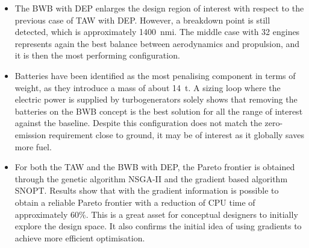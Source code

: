 \begin{itemize}
	\item The BWB with DEP enlarges the design region of interest with respect to the previous case of TAW with DEP.
	However, a breakdown point is still detected, which is approximately 1400~nmi. 
	The middle case with 32 engines represents again the best balance between aerodynamics and propulsion, and it is then the most performing configuration.
	
	\item Batteries have been identified as the most penalising component in terms of weight, as they introduce a mass of about 14~\si{\tonne}. 
	A sizing loop where the electric power is supplied by turbogenerators solely shows that removing the batteries on the BWB concept is the best solution for all the range of interest against the baseline. 
	Despite this configuration does not match the zero-emission requirement close to ground, it may be of interest as it globally saves more fuel.
	
	\item For both the TAW and the BWB with DEP, the Pareto frontier is obtained through the genetic algorithm NSGA-II and the gradient based algorithm SNOPT. 
	Results show that with the gradient information is possible to obtain a reliable Pareto frontier with a reduction of CPU time of approximately 60\%.
	This is a great asset for conceptual designers to initially explore the design space.
	It also confirms the initial idea of using gradients to achieve more efficient optimisation. 
\end{itemize}

